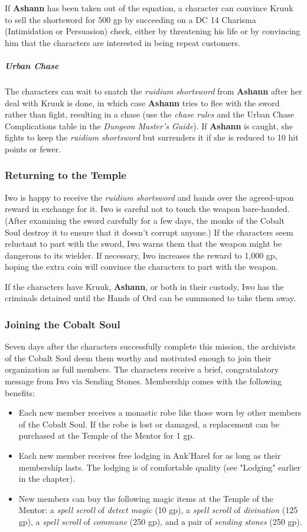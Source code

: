 \documentclass[10pt,a4paper,twoside,fancy,bg=print,twocolumn,openany,nodeprecatedcode]{dndbook}
\begin{document}
If \textbf{Ashann} has been taken out of the equation, a character can convince Kruuk to sell the shortsword for 500 gp by succeeding on a DC 14 Charisma (Intimidation or Persuasion) check, either by threatening his life or by convincing him that the characters are interested in being repeat customers.

\subparagraph{Urban Chase}
The characters can wait to snatch the \textit{ruidium shortsword} from \textbf{Ashann} after her deal with Kruuk is done, in which case \textbf{Ashann} tries to flee with the sword rather than fight, resulting in a chase (use the \textit{chase rules} and the Urban Chase Complications table in the \textit{Dungeon Master's Guide}). If \textbf{Ashann} is caught, she fights to keep the \textit{ruidium shortsword} but surrenders it if she is reduced to 10 hit points or fewer.

\subsubsection{Returning to the Temple}
Iwo is happy to receive the \textit{ruidium shortsword} and hands over the agreed-upon reward in exchange for it. Iwo is careful not to touch the weapon bare-handed. (After examining the sword carefully for a few days, the monks of the Cobalt Soul destroy it to ensure that it doesn't corrupt anyone.) If the characters seem reluctant to part with the sword, Iwo warns them that the weapon might be dangerous to its wielder. If necessary, Iwo increases the reward to 1,000 gp, hoping the extra coin will convince the characters to part with the weapon.

If the characters have Kruuk, \textbf{Ashann}, or both in their custody, Iwo has the criminals detained until the Hands of Ord can be summoned to take them away.

\subsubsection{Joining the Cobalt Soul}
Seven days after the characters successfully complete this mission, the archivists of the Cobalt Soul deem them worthy and motivated enough to join their organization as full members. The characters receive a brief, congratulatory message from Iwo via Sending Stones. Membership comes with the following benefits:


\begin{itemize}
\item Each new member receives a monastic robe like those worn by other members of the Cobalt Soul. If the robe is lost or damaged, a replacement can be purchased at the Temple of the Mentor for 1 gp.
\item Each new member receives free lodging in Ank'Harel for as long as their membership lasts. The lodging is of comfortable quality (see "Lodging" earlier in the chapter).
\item New members can buy the following magic items at the Temple of the Mentor: a \textit{spell scroll} of \textit{detect magic} (10 gp), a \textit{spell scroll} of \textit{divination} (125 gp), a \textit{spell scroll} of \textit{commune} (250 gp), and a pair of \textit{sending stones} (250 gp).
\end{itemize}
\end{document}
